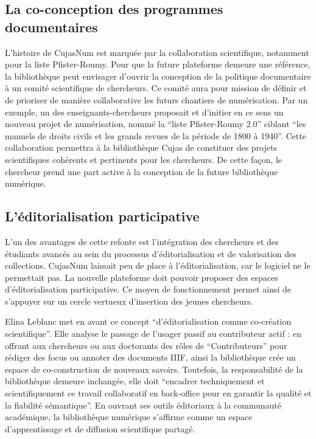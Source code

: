 \subsection{La co-conception des programmes documentaires}
L'histoire de CujasNum est marquée par la collaboration scientifique, notamment pour la liste Pfister-Roumy. Pour que la future plateforme demeure une référence, la bibliothèque peut envisager d'ouvrir la conception de la politique documentaire à un comité scientifique de chercheurs. Ce comité aura pour mission de définir et de prioriser de manière collaborative les futurs chantiers de numérisation. Par un exemple, un des enseignants-chercheurs proposait et d'initier en ce sens un nouveau projet de numérisation, nommé la \enquote{liste Pfister-Roumy 2.0} ciblant \enquote{les manuels de droits civils et les grands revues de la période de 1800 à 1940}. Cette collaboration permettra à la bibliothèque Cujas de constituer des projets scientifiques cohérents et pertinents pour les chercheurs. De cette façon, le chercheur prend une part active à la conception de la future bibliothèque numérique.

\subsection{L'éditorialisation participative}
L'un des avantages de cette refonte est l'intégration des chercheurs et des étudiants avancés au sein du processus d'éditorialisation et de valorisation des collections. CujasNum laissait peu de place à l'éditorialisation, car le logiciel ne le permettait pas. La nouvelle plateforme doit pouvoir proposer des espaces d'éditorialisation participative. Ce moyen de fonctionnement permet ainsi de s'appuyer sur un cercle vertueux d'insertion des jeunes chercheurs.

Elina Leblanc met en avant ce concept \enquote{d'éditorialisation comme co-création scientifique}. Elle analyse le passage de l'usager passif au contributeur actif : en offrant aux chercheurs ou aux doctorants des rôles de \enquote{Contributeurs} pour rédiger des focus ou annoter des documents IIIF, ainsi la bibliothèque crée un espace de co-construction de nouveaux savoirs. Toutefois, la responsabilité de la bibliothèque demeure inchangée, elle doit \enquote{encadrer techniquement et scientifiquement ce travail collaboratif en back-office pour en garantir la qualité et la fiabilité sémantique}. En ouvrant ses outils éditoriaux à la communauté académique, la bibliothèque numérique s'affirme comme un espace d'apprentissage et de diffusion scientifique partagé.
\bigskip

